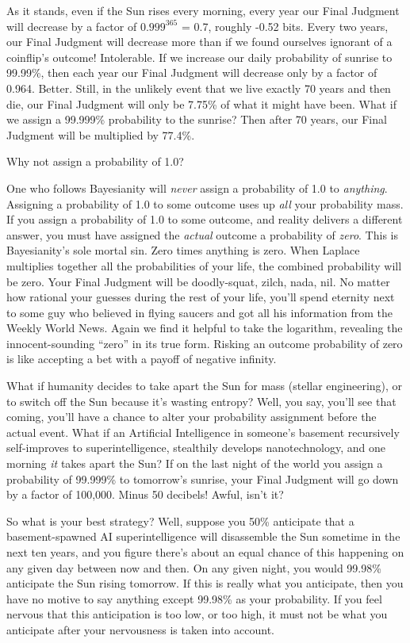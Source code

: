 {
 As it stands, even if the Sun rises every morning, every year our
Final Judgment will decrease by a factor of $0.999^{365}$
= 0.7, roughly -0.52 bits. Every two years, our Final Judgment will
decrease more than if we found ourselves ignorant of a
coinflip's outcome! Intolerable. If we increase our
daily probability of sunrise to 99.99\%, then each year our Final
Judgment will decrease only by a factor of 0.964. Better. Still, in the
unlikely event that we live exactly 70 years and then die, our Final
Judgment will only be 7.75\% of what it might have been. What if we
assign a 99.999\% probability to the sunrise? Then after 70 years, our
Final Judgment will be multiplied by 77.4\%.}

{
 Why not assign a probability of 1.0?}

{
 One who follows Bayesianity will \textit{never} assign a
probability of 1.0 to \textit{anything}. Assigning a probability of 1.0
to some outcome uses up \textit{all} your probability mass. If you
assign a probability of 1.0 to some outcome, and reality delivers a
different answer, you must have assigned the \textit{actual} outcome a
probability of \textit{zero}. This is Bayesianity's
sole mortal sin. Zero times anything is zero. When Laplace multiplies
together all the probabilities of your life, the combined probability
will be zero. Your Final Judgment will be doodly-squat, zilch, nada,
nil. No matter how rational your guesses during the rest of your life,
you'll spend eternity next to some guy who believed in
flying saucers and got all his information from the Weekly World News.
Again we find it helpful to take the logarithm, revealing the
innocent-sounding ``zero'' in its
true form. Risking an outcome probability of zero is like accepting a
bet with a payoff of negative infinity.}

{
 What if humanity decides to take apart the Sun for mass (stellar
engineering), or to switch off the Sun because it's
wasting entropy? Well, you say, you'll see that coming,
you'll have a chance to alter your probability
assignment before the actual event. What if an Artificial Intelligence
in someone's basement recursively self-improves to
superintelligence, stealthily develops nanotechnology, and one morning
\textit{it} takes apart the Sun? If on the last night of the world you
assign a probability of 99.999\% to tomorrow's sunrise,
your Final Judgment will go down by a factor of 100,000. Minus 50
decibels! Awful, isn't it?}

{
 So what is your best strategy? Well, suppose you 50\% anticipate
that a basement-spawned AI superintelligence will disassemble the Sun
sometime in the next ten years, and you figure there's
about an equal chance of this happening on any given day between now
and then. On any given night, you would 99.98\% anticipate the Sun
rising tomorrow. If this is really what you anticipate, then you have
no motive to say anything except 99.98\% as your probability. If you
feel nervous that this anticipation is too low, or too high, it must
not be what you anticipate after your nervousness is taken into
account.}

